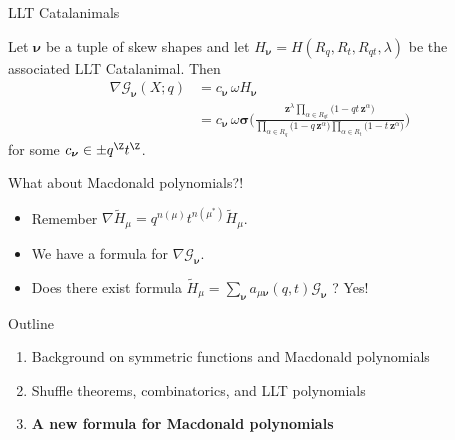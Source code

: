 \documentclass[dvipsnames]{beamer}
\newcommand{\zz}{{\boldsymbol z}}
\newcommand{\sigmabold}{\boldsymbol \sigma}
\newcommand{\Htild}{\tilde{H}}
\newcommand{\Gcal}{{\mathcal G}}
\newcommand{\nubold}{{\boldsymbol \nu }}
\theoremstyle{definition}
\newcounter{c}
\begin{document}
\begin{frame}{LLT Catalanimals}
\begin{theorem}
Let  $\nubold$ be a tuple of skew shapes 
and let $H_{\nubold} = H(R_q,R_t,R_{qt}, \lambda)$ be the associated LLT Catalanimal. Then
 \vspace{-2mm}
\begin{align*}
\nabla \Gcal_{\nubold}(X;q)
& = c_\nubold\,\omega H_{\nubold}
\\
& = c_\nubold  \, \omega \sigmabold
 \bigg(\frac{\zz ^\lambda \prod_{\alpha \in
R_{qt}} \big(1-q t\, \zz ^\alpha \big)} {\prod_{\alpha \in R_q} \big(1-q \, \zz ^\alpha\big)
\prod_{\alpha \in R_t} \big(1-t \, \zz ^\alpha\big)}\bigg)
\end{align*}
for some $c_\nubold \in \pm q^\Z t^{\Z}$.
\end{theorem}
\end{frame}
  \begin{frame}{What about Macdonald polynomials?!}
    \begin{itemize}
    \item Remember \(\nabla \Htild_\mu = q^{n(\mu)} t^{n(\mu^*)} \Htild_\mu\). \pause
    \item We have a formula for \(\nabla \Gcal_\nubold\). \pause
    \item Does there exist formula \(\Htild_\mu = \sum_\nubold a_{\mu
        \nubold}(q,t) \Gcal_\nubold\) ? \pause Yes!
    \end{itemize}
  \end{frame}
\begin{frame}{Outline}
  \begin{enumerate}
  \item Background on symmetric functions and Macdonald polynomials
  \item Shuffle theorems, combinatorics, and LLT polynomials
  \item {\bf A new formula for Macdonald polynomials}
  \end{enumerate}
\end{frame}
\end{document}
